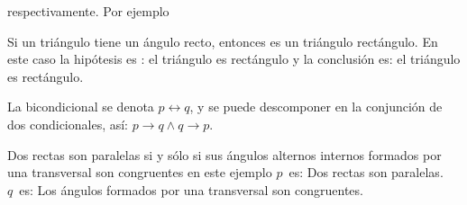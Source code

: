 respectivamente.
Por ejemplo
\begin{ejemplo}{ Si un tri\'angulo tiene un \'angulo recto, entonces es un
tri\'angulo rect\'angulo.}
En este caso la hip\'otesis es : el tri\'angulo es rect\'angulo y la
conclusi\'on es: el tri\'angulo es rect\'angulo.
\end{ejemplo}
La bicondicional se denota $p\longleftrightarrow q$, y se puede descomponer en
la conjunci\'on de dos condicionales, as\'i: $ p\longrightarrow
q \wedge q\longrightarrow p$.
\begin{ejemplo}{Dos rectas son paralelas si y sólo si sus ángulos alternos
internos formados por una transversal son congruentes}
en este ejemplo $p$\ es: Dos rectas son paralelas.\\
$q$\ es: Los ángulos formados por una transversal son congruentes.   
\end{ejemplo}

